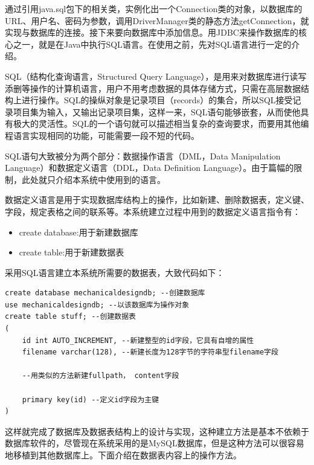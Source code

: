 \documentclass[12pt,a4paper]{article}
\begin{document}
	通过引用{\Times java.sql}包下的相关类，实例化出一个{\Times Connection}类的对象，以数据库的{\Times URL}、用户名、密码为参数，调用{\Times DriverManager}类的静态方法{\Times getConnection}，就实现与数据库的连接。接下来要向数据库中添加信息。用{\Times JDBC}来操作数据库的核心之一，就是在{\Times Java}中执行{\Times SQL}语言。在使用之前，先对{\Times SQL}语言进行一定的介绍。
	
	{\Times SQL}（结构化查询语言，{\Times Structured Query Language}），是用来对数据库进行读写添删等操作的计算机语言，用户不用考虑数据的具体存储方式，只需在高层数据结构上进行操作。{\Times SQL}的操纵对象是记录项目（{\Times records}）的集合，所以{\Times SQL}接受记录项目集为输入，又输出记录项目集，这样一来，{\Times SQL}语句能够嵌套，从而使他具有极大的灵活性。{\Times SQL}的一个语句就可以描述相当复杂的查询要求，而要用其他编程语言实现相同的功能，可能需要一段不短的代码。
	
	{\Times SQL}语句大致被分为两个部分：数据操作语言（{\Times DML}，{\Times Data Manipulation Language}）和数据定义语言（{\Times DDL}，{\Times Data Definition Language}）。由于篇幅的限制，此处就只介绍本系统中使用到的语言。
	
	数据定义语言是用于实现数据库结构上的操作，比如新建、删除数据表，定义键、字段，规定表格之间的联系等。本系统建立过程中用到的数据定义语言指令有：
\begin{itemize}
	\item
	{\Times create database}:用于新建数据库
	\item
	{\Times create table}:用于新建数据表
\end{itemize}		
	
	采用{\Times SQL}语言建立本系统所需要的数据表，大致代码如下：
	
	\lstset{language=SQL,frame=lines,basicstyle=\Times, commentstyle=\SimSun,texcl=true}
	\begin{lstlisting}
create database mechanicaldesigndb; --创建数据库
use mechanicaldesigndb; --以该数据库为操作对象
create table stuff; --创建数据表
(
	id int AUTO_INCREMENT, --新建整型的id字段，它具有自增的属性
	filename varchar(128), --新建长度为128字节的字符串型filename字段

	--用类似的方法新建fullpath， content字段
	
	primary key(id) --定义id字段为主键
)
	\end{lstlisting}	
	
	这样就完成了数据库及数据表结构上的设计与实现，这种建立方法是基本不依赖于数据库软件的，尽管现在系统采用的是{\Times MySQL}数据库，但是这种方法可以很容易地移植到其他数据库上。下面介绍在数据表内容上的操作方法。
	
\end{document}
